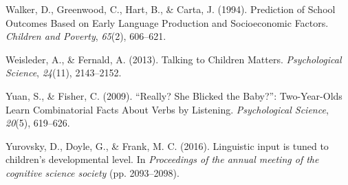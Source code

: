 \documentclass[10pt, letterpaper]{article}
\begin{document}
\leavevmode\hypertarget{ref-Anonymous:GIFaG1Qd}{}%
Walker, D., Greenwood, C., Hart, B., \& Carta, J. (1994). Prediction of
School Outcomes Based on Early Language Production and Socioeconomic
Factors. \emph{Children and Poverty}, \emph{65}(2), 606--621.

\leavevmode\hypertarget{ref-Weisleder:2013ht}{}%
Weisleder, A., \& Fernald, A. (2013). Talking to Children Matters.
\emph{Psychological Science}, \emph{24}(11), 2143--2152.

\leavevmode\hypertarget{ref-OVIDDS:2009uz}{}%
Yuan, S., \& Fisher, C. (2009). ``Really? She Blicked the Baby?'':
Two-Year-Olds Learn Combinatorial Facts About Verbs by Listening.
\emph{Psychological Science}, \emph{20}(5), 619--626.

\leavevmode\hypertarget{ref-Anonymous:r2JoRscQ}{}%
Yurovsky, D., Doyle, G., \& Frank, M. C. (2016). Linguistic input is
tuned to children's developmental level. In \emph{Proceedings of the
annual meeting of the cognitive science society} (pp. 2093--2098).


\end{document}
